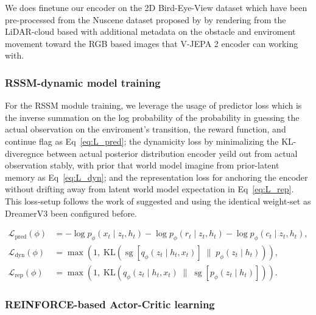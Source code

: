 We does finetune our encoder on the 2D Bird-Eye-View dataset which have been pre-processed from the Nuscene dataset proposed by \cite{Caesar2021} by rendering from the LiDAR-cloud based with additional metadata on the obstacle and enviroment movement toward the RGB based images that V-JEPA 2 encoder can working with.

\subsubsection*{RSSM-dynamic model training}

For the RSSM module training, we leverage the usage of predictor loss which is the inverse summation on the log probability of the probability in guessing the actual observation on the enviroment's transition, the reward function, and continue flag as Eq~\eqref{eq:L_pred}; the dynamicity loss by minimalizing the KL-diveregnce between actual posterior distribution encoder yeild out from actual observation stably, with prior that world model imagine from prior-latent memory as Eq~\eqref{eq:L_dyn}; and the representation loss for anchoring the encoder without drifting away from latent world model expectation in Eq~\eqref{eq:L_rep}. This loss-setup follows the work of \cite{Hafner2023} suggested and using the identical weight-set as DreamerV3 been configured before.

\begin{align}
\mathcal{L}_{\text{pred}}(\phi)
&=
- \log p_\phi(x_t \mid z_t, h_t)
- \log p_\phi(r_t \mid z_t, h_t)
- \log p_\phi(c_t \mid z_t, h_t),
\label{eq:L_pred}
\\[6pt]
\mathcal{L}_{\text{dyn}}(\phi)
&=
\max\!\left(
1,\;
\mathrm{KL}\!\left(
\operatorname{sg}\!\left[q_\phi(z_t \mid h_t, x_t)\right]
\;\big\|\;
p_\phi(z_t \mid h_t)
\right)
\right),
\label{eq:L_dyn}
\\[6pt]
\mathcal{L}_{\text{rep}}(\phi)
&=
\max\!\left(
1,\;
\mathrm{KL}\!\left(
q_\phi(z_t \mid h_t, x_t)
\;\big\|\;
\operatorname{sg}\!\left[p_\phi(z_t \mid h_t)\right]
\right)
\right).
\label{eq:L_rep}
\end{align}

\subsubsection*{REINFORCE-based Actor-Critic learning}


